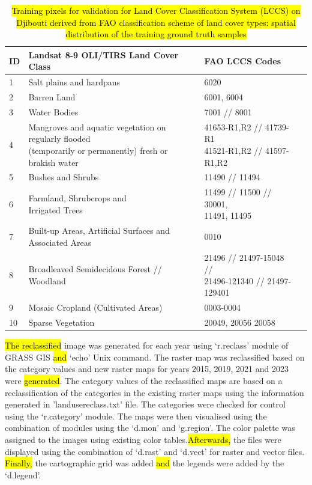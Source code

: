 \documentclass[jimaging,article,submit,pdftex,moreauthors]{Definitions/mdpi}
\begin{document}
\begin{table}[H]
\caption{\hl{Training pixels for validation for Land Cover Classification System (LCCS) on Djibouti derived from FAO classification scheme of land cover types: spatial distribution of the training ground truth samples}}\label{tabFAO}%
\small
\begin{tabularx}{\textwidth}{llll}
\toprule
ID & Landsat 8-9 OLI/TIRS Land Cover Class & FAO LCCS Codes  \\
\midrule

       1 & Salt plains and hardpans & 6020 \\ \midrule
        2 & Barren Land & 6001, 6004  \\ \midrule
        3 & Water Bodies & 7001 // 8001  \\ \midrule
        4 & \makecell{Mangroves and aquatic vegetation on regularly flooded \\(temporarily or permanently) fresh or brakish water} & \makecell{41653-R1,R2 // 41739-R1 \\ 41521-R1,R2 // 41597-R1,R2}  \\ \midrule
        5 & Bushes and Shrubs & 11490 // 11494 \\ \midrule
        6 & \makecell{Farmland, Shrubcrops and \\Irrigated Trees} & \makecell{11499 // 11500 // 30001, \\11491, 11495}  \\ \midrule
        7 & Built-up Areas, Artificial Surfaces and Associated Areas & 0010  \\ \midrule
        8 & Broadleaved Semidecidous Forest // Woodland & \makecell{21496 // 21497-15048 // \\21496-121340 // 21497-129401} \\  \midrule
        9 & Mosaic Cropland (Cultivated Areas) & 0003-0004 \\ \midrule
        10 & Sparse Vegetation & 20049, 20056 20058  \\
\bottomrule
\end{tabularx}
\end{table}

\hl{The reclassified }image was generated for each year using ‘r.reclass’ module of GRASS GIS \hl{and} ‘echo’ Unix command.\hl{ }The raster map was reclassified based on the category values and new raster maps for years 2015, 2019, 2021 and 2023 were \hl{generated}. The category values of the reclassified maps are based on a reclassification of the categories in the existing raster maps using the information generated in 'landusereclass.txt' file. The categories were checked for control using the ‘r.category’ module. The maps were then visualised using the combination of modules using the ‘d.mon’ and ‘g.region’.  The color palette was assigned to the images using existing color tables.\hl{Afterwards, }the files were displayed using the combination of ‘d.rast’ and ‘d.vect’ for raster and vector files. \hl{Finally, }the cartographic grid was added \hl{and} the legends were added by the ‘d.legend’.
\end{document}
